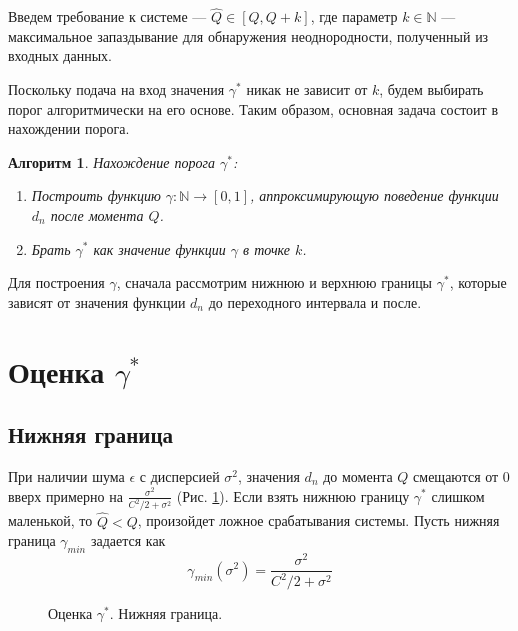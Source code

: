 \documentclass[specialist, substylefile = spbu.rtx,
			   subf, href, 12pt]{disser}
\newtheorem{algorithm}{Алгоритм}
\begin{document}
Введем требование к системе --- $ \hat{Q} \in [Q, Q+k] $, где параметр $ k \in \mathbb{N} $ --- максимальное запаздывание для обнаружения неоднородности, полученный из входных данных. 

Поскольку подача на вход значения $ \gamma^* $ никак не зависит от $ k $, будем выбирать порог алгоритмически на его основе. Таким образом, основная задача состоит в нахождении порога. 
\begin{algorithm}\label{algo:fix_gamma}
	Нахождение порога $ \gamma^* $:
	\begin{enumerate}
		\item Построить функцию $ \gamma: \mathbb{N} \rightarrow [0, 1] $, аппроксимирующую поведение функции $ d_n $ после момента $ Q $.
		\item Брать $ \gamma^* $ как значение функции $ \gamma $ в точке $ k $.
	\end{enumerate}
\end{algorithm}

Для построения $ \gamma $, сначала рассмотрим нижнюю и верхнюю границы $ \gamma^* $, которые зависят от значения функции $ d_n $ до переходного интервала и после.

\section{Оценка $ \gamma^* $}
\subsection{Нижняя граница}\label{ch:lower_border}

При наличии шума $ \epsilon $ с дисперсией $ \sigma^2 $, значения $ d_n $ до момента $ Q $ смещаются от $ 0 $ вверх примерно на $ \frac{\sigma^2}{C^2/2 + \sigma^2} $ (Рис. \ref{pic:estimate_gamma_lower}). Если взять нижнюю границу $ \gamma^* $ слишком маленькой, то $ \hat{Q} < Q $, произойдет ложное срабатывания системы. Пусть нижняя граница $ \gamma_{min} $ задается как
\begin{equation}\label{eq:gamma_min}
	\gamma_{min}(\sigma^2) = \frac{\sigma^2}{C^2/2 + \sigma^2}
\end{equation}

\begin{figure}[!hhh]
	\caption{Оценка $ \gamma^* $. Нижняя граница.}
	\label{pic:estimate_gamma_lower}
\end{figure}
\end{document}
